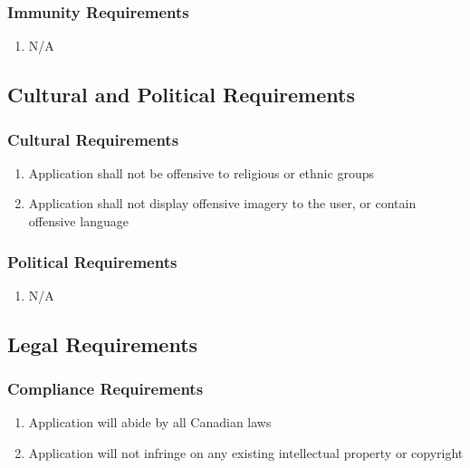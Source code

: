 \documentclass[]{article}
\begin{document}
\subsubsection{Immunity Requirements}
\label{ssub:immunity_requirements}
\begin{enumerate}[{SR}1. ]
	\item N/A
\end{enumerate}


\subsection{Cultural and Political Requirements}
\label{sub:cultural_and_political_requirements}

\subsubsection{Cultural Requirements}
\label{ssub:cultural_requirements}
\begin{enumerate}[{CP}1. ]
	\item Application shall not be offensive to religious or ethnic groups
	\item Application shall not display offensive imagery to the user, or contain offensive language
\end{enumerate}

\subsubsection{Political Requirements}
\label{ssub:political_requirements}
\begin{enumerate}[{CP}1. ]
	\item N/A
\end{enumerate}


\subsection{Legal Requirements}
\label{sub:legal_requirements}

\subsubsection{Compliance Requirements}
\label{ssub:compliance_requirements}
\begin{enumerate}[{LR}1. ]
	\item Application will abide by all Canadian laws
	\item Application will not infringe on any existing intellectual property or copyright 
\end{enumerate}
\end{document}
